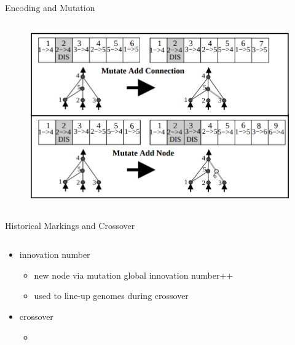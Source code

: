 \documentclass{beamer}
\begin{document}
\begin{frame}{Encoding and Mutation}
\begin{columns}
\begin{column}{0.5\textwidth}
\begin{figure}[c]
            \end{figure}
            \begin{figure}[c]
                \includegraphics[width = \textwidth]{img/mutation.png}
            \end{figure}
        \end{column}
    \end{columns}
\end{frame}
\begin{frame}{Historical Markings and Crossover}
    \begin{columns}
        \begin{column}{0.7\textwidth}
            \begin{itemize}
                \item innovation number
                      \begin{itemize}
                          \item new node via mutation \textrightarrow global innovation number++
                          \item used to line-up genomes during crossover
                      \end{itemize}
                \item crossover
                \begin{itemize}
                    \item 
                \end{itemize}
                
            \end{itemize}
        \end{column}
        \begin{column}{0.3\textwidth}
           
        \end{column}
    \end{columns}
\end{frame}
\end{document}
